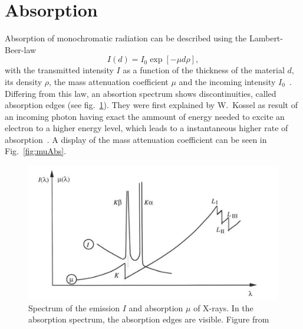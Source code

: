  
\section{Absorption}\label{sec:Q3}
Absorption of monochromatic radiation can be described using the Lambert-Beer-law
\begin{equation}
    I(d) = I_0 \exp[-\mu d\rho],
\end{equation}
with the transmitted intensity $I$ as a function of the thickness of the material $d$, its density $\rho$, the mass attenuation coefficient $\mu$ and the incoming intensity $I_0$~\cite{Bohm.2021}. Differing from this law, an absortion spectrum shows discontinuities, called absorption edges (see fig.~\ref{fig:AbsorpEdgesDemo}). They were first explained by W.~Kossel as result of an incoming photon having exact the ammount of energy needed to excite an electron to a higher energy level, which leads to a instantaneous higher rate of absorption~\cite{Kossel.1920}. A display of the mass attenuation coefficient can be seen in Fig.~\ref{fig:muAbs}.

\begin{figure}[ht]
    \centering
    \includegraphics[width = 0.7\linewidth]{Bilder/Grundlagen/absEdgesDemo.png}
    \caption{Spectrum of the emission $I$ and absorption $\mu$ of X-rays. In the absorption spectrum, the absorption edges are visible. Figure from~\cite{Schwarzenbach.2001}}
    \label{fig:AbsorpEdgesDemo}
\end{figure}

